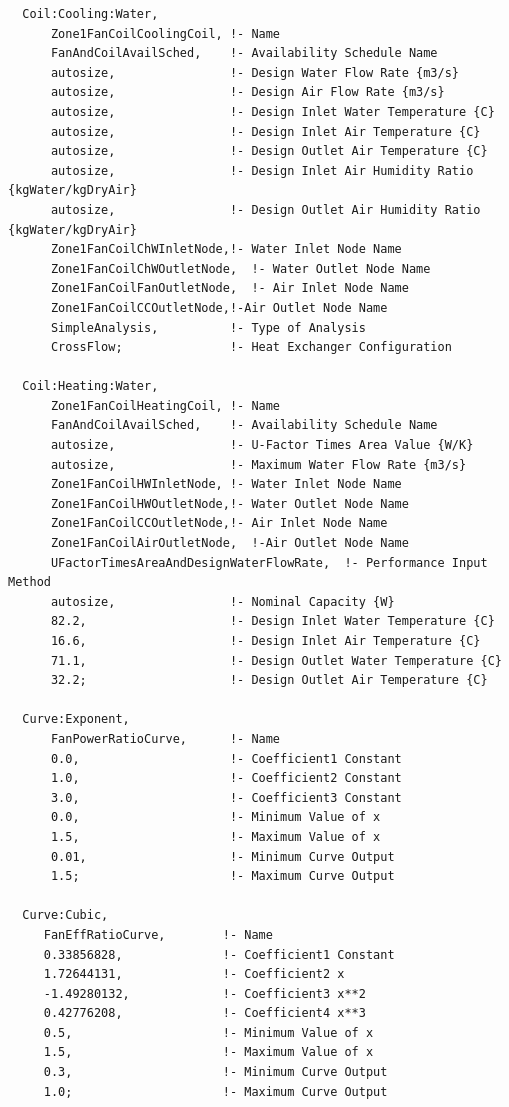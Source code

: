 \begin{lstlisting}
  Coil:Cooling:Water,
      Zone1FanCoilCoolingCoil, !- Name
      FanAndCoilAvailSched,    !- Availability Schedule Name
      autosize,                !- Design Water Flow Rate {m3/s}
      autosize,                !- Design Air Flow Rate {m3/s}
      autosize,                !- Design Inlet Water Temperature {C}
      autosize,                !- Design Inlet Air Temperature {C}
      autosize,                !- Design Outlet Air Temperature {C}
      autosize,                !- Design Inlet Air Humidity Ratio {kgWater/kgDryAir}
      autosize,                !- Design Outlet Air Humidity Ratio {kgWater/kgDryAir}
      Zone1FanCoilChWInletNode,!- Water Inlet Node Name
      Zone1FanCoilChWOutletNode,  !- Water Outlet Node Name
      Zone1FanCoilFanOutletNode,  !- Air Inlet Node Name
      Zone1FanCoilCCOutletNode,!-Air Outlet Node Name
      SimpleAnalysis,          !- Type of Analysis
      CrossFlow;               !- Heat Exchanger Configuration

  Coil:Heating:Water,
      Zone1FanCoilHeatingCoil, !- Name
      FanAndCoilAvailSched,    !- Availability Schedule Name
      autosize,                !- U-Factor Times Area Value {W/K}
      autosize,                !- Maximum Water Flow Rate {m3/s}
      Zone1FanCoilHWInletNode, !- Water Inlet Node Name
      Zone1FanCoilHWOutletNode,!- Water Outlet Node Name
      Zone1FanCoilCCOutletNode,!- Air Inlet Node Name
      Zone1FanCoilAirOutletNode,  !-Air Outlet Node Name
      UFactorTimesAreaAndDesignWaterFlowRate,  !- Performance Input Method
      autosize,                !- Nominal Capacity {W}
      82.2,                    !- Design Inlet Water Temperature {C}
      16.6,                    !- Design Inlet Air Temperature {C}
      71.1,                    !- Design Outlet Water Temperature {C}
      32.2;                    !- Design Outlet Air Temperature {C}

  Curve:Exponent,
      FanPowerRatioCurve,      !- Name
      0.0,                     !- Coefficient1 Constant
      1.0,                     !- Coefficient2 Constant
      3.0,                     !- Coefficient3 Constant
      0.0,                     !- Minimum Value of x
      1.5,                     !- Maximum Value of x
      0.01,                    !- Minimum Curve Output
      1.5;                     !- Maximum Curve Output

  Curve:Cubic,
     FanEffRatioCurve,        !- Name
     0.33856828,              !- Coefficient1 Constant
     1.72644131,              !- Coefficient2 x
     -1.49280132,             !- Coefficient3 x**2
     0.42776208,              !- Coefficient4 x**3
     0.5,                     !- Minimum Value of x
     1.5,                     !- Maximum Value of x
     0.3,                     !- Minimum Curve Output
     1.0;                     !- Maximum Curve Output
\end{lstlisting}


